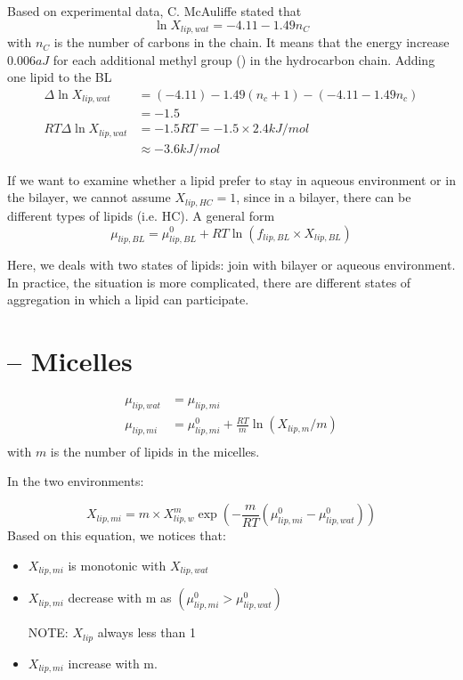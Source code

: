 Based on experimental data, C. McAuliffe stated that
\begin{equation}
  \ln X_{lip,wat} = -4.11 - 1.49 n_C
\end{equation}
with $n_C$ is the number of carbons in the chain. It means that  the
energy increase $0.006aJ$ for each additional methyl group ()
in the hydrocarbon chain. Adding one lipid to the BL
\begin{equation}
  \label{eq:1}\begin{split}
  \Delta \ln X_{lip,wat}& = (-4.11) - 1.49 (n_c+1)-(-4.11-1.49n_c)\\
&= -1.5 \\
RT\Delta \ln X_{lip,wat} &=-1.5RT = -1.5\times 2.4 kJ/mol \\
&\approx -3.6 kJ/mol
\end{split}
\end{equation}


If we want to examine whether a lipid prefer to stay in aqueous
environment or in the bilayer, we cannot assume $X_{lip,HC} = 1$,
since in a bilayer, there can be different types of lipids
(i.e. HC). A general form 
\begin{equation}
  \mu_{lip,BL} = \mu_{lip,BL}^0 + RT \ln(f_{lip,BL}\times X_{lip,BL})
\end{equation}

Here, we deals with two states of lipids: join with bilayer or aqueous
environment. In practice, the situation is more complicated, there are
different states of aggregation in which a lipid can participate. 

\section{-- Micelles}
\label{sec:lipid-in-micelle}
\label{sec:micelle}

\begin{equation}
  \label{eq:2}\begin{split}
  \mu_{lip,wat}& = \mu_{lip,mi} \\
  \mu_{lip,mi} &= \mu_{lip,mi}^0+\frac{RT}{m}\ln (X_{lip,m}/m) \\
\end{split}
\end{equation}
with $m$ is the number of lipids in the micelles.

In the two environments:

\begin{equation}
  \label{eq:3}
  X_{lip,mi} = m \times X_{lip,w}^m \exp (-\frac{m}{RT}(\mu_{lip,mi}^0-\mu_{lip,wat}^0))
\end{equation}
Based on this equation, we notices that:
\begin{itemize}
\item $X_{lip,mi}$ is monotonic with $X_{lip,wat}$
\item $X_{lip,mi}$ decrease with m as
  $(\mu_{lip,mi}^0>\mu_{lip,wat}^0)$

NOTE: $X_{lip}$ always less than 1
\item $X_{lip,mi}$ increase with m.
\end{itemize}

